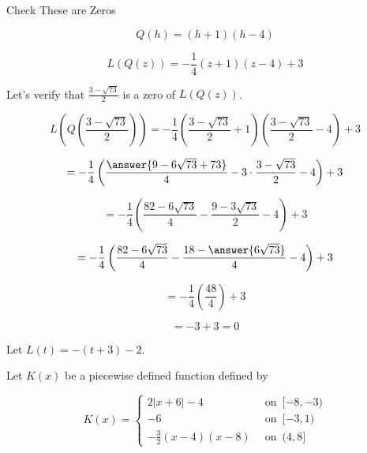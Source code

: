 \documentclass{ximera}
\begin{document}
\begin{claim} Check These are Zeros


\[   Q(h) = (h+1)(h-4)   \]


\[   L(Q(z)) = -\frac{1}{4} (z+1)(z-4) + 3   \]


Let's verify that $\frac{3 - \sqrt{73}}{2}$ is a zero of $L(Q(z))$.



\[   L \left( Q \left( \frac{3 - \sqrt{73}}{2} \right) \right) = -\frac{1}{4} \left( \frac{3 - \sqrt{73}}{2}+1 \right) \left( \frac{3 - \sqrt{73}}{2}-4 \right) + 3    \]



\[  = -\frac{1}{4} \left( \frac{\answer{9 - 6 \sqrt{73} + 73}}{4} - 3 \cdot \frac{3 - \sqrt{73}}{2} - 4 \right) + 3    \]


\[  = -\frac{1}{4} \left( \frac{82 - 6 \sqrt{73}}{4} - \frac{9 - 3 \sqrt{73}}{2} - 4 \right) + 3    \]


\[  = -\frac{1}{4} \left( \frac{82 - 6 \sqrt{73}}{4} - \frac{18 - \answer{6 \sqrt{73}}}{4} - 4 \right) + 3    \]


\[  = -\frac{1}{4} \left( \frac{48}{4} \right) + 3    \]


\[  = -3 + 3   = 0 \]


\end{claim}











































Let $L(t) = -(t+3) - 2$.


Let $K(x)$ be a piecewise defined function defined by 


\[
K(x) = 
\begin{cases}
  2|x+6| - 4         &    \,     \text{ on } \,   [-8,-3)    \\
  -6               &    \,     \text{ on } \,    [-3,1)      \\
  -\frac{3}{2}(x-4)(x-8)    &   \,     \text{ on } \,    (4,8]
\end{cases}
\]
\end{document}
